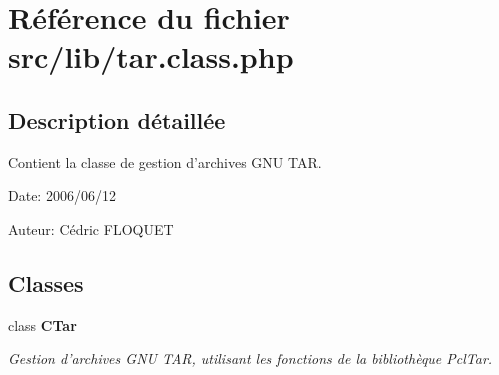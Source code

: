 \section{Référence du fichier src/lib/tar.class.php}
\label{tar_8class_8php}


\subsection{Description détaillée}
Contient la classe de gestion d'archives GNU TAR. 

\begin{Desc}
\item[Date:]2006/06/12\end{Desc}
\begin{Desc}
\item[Auteur:]Cédric FLOQUET \end{Desc}


\subsection*{Classes}
\begin{CompactItemize}
\item 
class {\bf CTar}
\begin{CompactList}\small\item\em Gestion d'archives GNU TAR, utilisant les fonctions de la bibliothèque PclTar. \item\end{CompactList}\end{CompactItemize}
